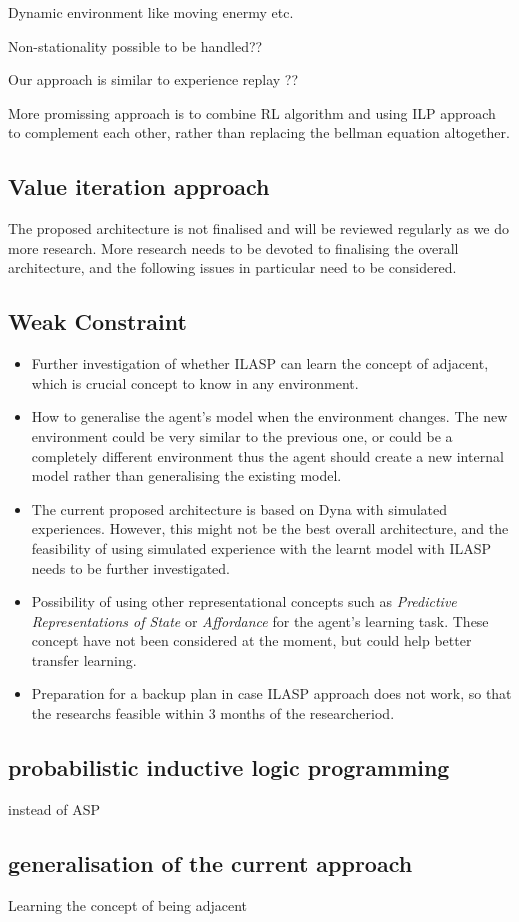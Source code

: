 Dynamic environment like moving enermy etc.

Non-stationality possible to be handled??

Our approach is similar to experience replay ??

More promissing approach is to combine RL algorithm and using ILP approach to complement each other, rather than replacing the bellman equation altogether. 

\subsection{Value iteration approach}

The proposed architecture is not finalised and will be reviewed regularly as we do more research.
More research needs to be devoted to finalising the overall architecture, and the following issues in particular need to be considered.

\subsection{Weak Constraint}

\begin{itemize}

\item Further investigation of whether ILASP can learn the concept of adjacent, which is crucial concept to know in any environment.
\item How to generalise the agent's model when the environment changes. The new environment could be very similar to the previous one, or could be a completely different environment thus the agent should create a new internal model rather than generalising the existing model.
\item The current proposed architecture is based on Dyna with simulated experiences. However, this might not be the best overall architecture, and the feasibility of using simulated experience with the learnt model with ILASP needs to be further investigated.

\item Possibility of using other representational concepts such as \textit{Predictive Representations of State} or \textit{Affordance} \cite{Sridharan2017} for the agent's learning task. These concept have not been considered at the moment, but could help better transfer learning.

\item Preparation for a backup plan in case ILASP approach does not work, so that the researchs feasible within 3 months of the researcheriod.

\end{itemize}

\subsection{probabilistic inductive logic programming}
instead of ASP

\subsection{generalisation of the current approach}

Learning the concept of being adjacent